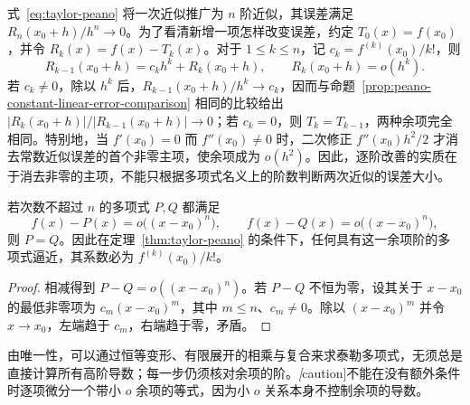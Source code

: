 式~\eqref{eq:taylor-peano} 将一次近似推广为 $n$ 阶近似，其误差满足 $R_n(x_0+h)/h^n\to0$。为了看清新增一项怎样改变误差，约定 $T_0(x)=f(x_0)$，并令 $R_k(x)=f(x)-T_k(x)$。对于 $1\leq k\leq n$，记 $c_k=f^{(k)}(x_0)/k!$，则
\[
    R_{k-1}(x_0+h)=c_kh^k+R_k(x_0+h),\qquad
    R_k(x_0+h)=o(h^k).
\]
若 $c_k\ne0$，除以 $h^k$ 后，$R_{k-1}(x_0+h)/h^k\to c_k$，因而与命题~\ref{prop:peano-constant-linear-error-comparison} 相同的比较给出 $|R_k(x_0+h)|/|R_{k-1}(x_0+h)|\to0$；若 $c_k=0$，则 $T_k=T_{k-1}$，两种余项完全相同。特别地，当 $f'(x_0)=0$ 而 $f''(x_0)\ne0$ 时，二次修正 $f''(x_0)h^2/2$ 才消去常数近似误差的首个非零主项，使余项成为 $o(h^2)$。因此，逐阶改善的实质在于消去非零的主项，不能只根据多项式名义上的阶数判断两次近似的误差大小。

\begin{proposition}[多项式逼近的唯一性]
\label{prop:taylor-polynomial-uniqueness}
若次数不超过 $n$ 的多项式 $P,Q$ 都满足
\[
    f(x)-P(x)=o\bigl((x-x_0)^n\bigr),\qquad
    f(x)-Q(x)=o\bigl((x-x_0)^n\bigr),
\]
则 $P=Q$。因此在定理~\ref{thm:taylor-peano} 的条件下，任何具有这一余项阶的多项式逼近，其系数必为 $f^{(k)}(x_0)/k!$。
\end{proposition}

\begin{proof}
相减得到 $P-Q=o((x-x_0)^n)$。若 $P-Q$ 不恒为零，设其关于 $x-x_0$ 的最低非零项为 $c_m(x-x_0)^m$，其中 $m\leq n$、$c_m\neq0$。除以 $(x-x_0)^m$ 并令 $x\to x_0$，左端趋于 $c_m$，右端趋于零，矛盾。
\end{proof}

由唯一性，可以通过恒等变形、有限展开的相乘与复合来求泰勒多项式，无须总是直接计算所有高阶导数；每一步仍须核对余项的阶。\emph[caution]{不能在没有额外条件时逐项微分一个带小 $o$ 余项的等式，因为小 $o$ 关系本身不控制余项的导数。}

